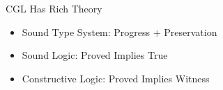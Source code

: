 \documentclass[slidestop,aspectratio=169]{beamer}
\providecommand{\KeYmaeraX}{KeYmaera X\xspace}
\newcommand{\CGL}{CGL\xspace}
\newcommand{\Isabelle}{Isabelle\xspace}
\newcommand{\CakeML}{CakeML\xspace}
\newcommand{\ctrlMon}{\textsf{\upshape ctrlMon}\xspace}
\newcommand{\plantMon}{\textsf{\upshape plantMon}\xspace}
\newcommand{\goback}{\!\!\!\!}
\theoremstyle{plain}
\theoremstyle{definition}
\theoremstyle{remark}
\begin{document}
\begin{frame}[t]{\CGL Has Rich Theory}
  \begin{itemize}
  \item Sound Type System: Progress + Preservation
  \item Sound Logic: Proved Implies True
  \item Constructive Logic: Proved Implies Witness
  \end{itemize}
\end{frame}



\end{document}
